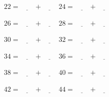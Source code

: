 \documentclass[12pt]{article}
\begin{document}
\noindent $22 = \underline{\hspace{2em}} + \underline{\hspace{2em}}$
\hfill $24 = \underline{\hspace{2em}} + \underline{\hspace{2em}}$ \hfill\null
\vspace{3ex}

\noindent $26 = \underline{\hspace{2em}} + \underline{\hspace{2em}}$
\hfill $28 = \underline{\hspace{2em}} + \underline{\hspace{2em}}$ \hfill\null
\vspace{3ex}

\noindent $30 = \underline{\hspace{2em}} + \underline{\hspace{2em}}$
\hfill $32 = \underline{\hspace{2em}} + \underline{\hspace{2em}}$ \hfill\null
\vspace{3ex}

\noindent $34 = \underline{\hspace{2em}} + \underline{\hspace{2em}}$
\hfill $36 = \underline{\hspace{2em}} + \underline{\hspace{2em}}$ \hfill\null
\vspace{3ex}

\noindent $38 = \underline{\hspace{2em}} + \underline{\hspace{2em}}$
\hfill $40 = \underline{\hspace{2em}} + \underline{\hspace{2em}}$ \hfill\null
\vspace{3ex}

\noindent $42 = \underline{\hspace{2em}} + \underline{\hspace{2em}}$
\hfill $44 = \underline{\hspace{2em}} + \underline{\hspace{2em}}$ \hfill\null
\vspace{3ex}
\end{document}
